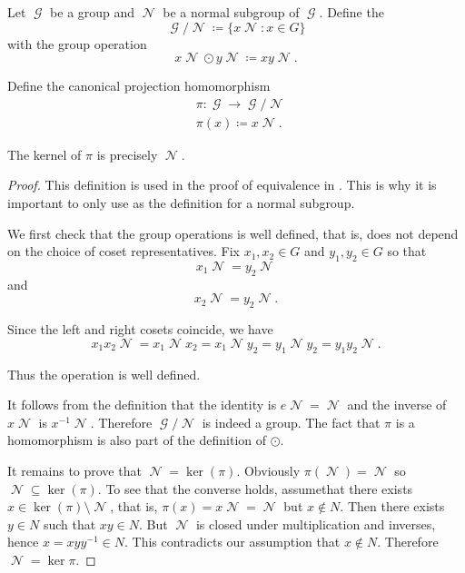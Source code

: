\begin{definition}\label{def:quotient_group}
  Let \( \mscrG \) be a group and \( \mscrN \) be a normal subgroup of \( \mscrG \). Define the 
  \begin{equation*}
    \mscrG / \mscrN \coloneqq \{ x \mscrN \colon x \in G \}
  \end{equation*}
  with the group operation
  \begin{equation*}
    x \mscrN \odot y \mscrN \coloneqq xy \mscrN.
  \end{equation*}

  Define the canonical projection homomorphism
  \begin{align*}
    &\pi: \mscrG \to \mscrG / \mscrN \\
    &\pi(x) \coloneqq x \mscrN.
  \end{align*}

  The kernel of \( \pi \) is precisely \( \mscrN \).
\end{definition}
\begin{proof}
  This definition is used in the proof of equivalence in . This is why it is important to only use  as the definition for a normal subgroup.

  We first check that the group operations is well defined, that is, does not depend on the choice of coset representatives. Fix \( x_1, x_2 \in G \) and \( y_1, y_2 \in G \) so that
  \begin{equation*}
    x_1 \mscrN = y_2 \mscrN
  \end{equation*}
  and
  \begin{equation*}
    x_2 \mscrN = y_2 \mscrN.
  \end{equation*}

  Since the left and right cosets coincide, we have
  \begin{equation*}
    x_1 x_2 \mscrN = x_1 \mscrN x_2 = x_1 \mscrN y_2 = y_1 \mscrN y_2 = y_1 y_2 \mscrN.
  \end{equation*}

  Thus the operation is well defined.

  It follows from the definition that the identity is \( e \mscrN = \mscrN \) and the inverse of \( x \mscrN \) is \( x^{-1} \mscrN \). Therefore \( \mscrG / \mscrN \) is indeed a group. The fact that \( \pi \) is a homomorphism is also part of the definition of \( \odot \).

  It remains to prove that \( \mscrN = \ker(\pi) \). Obviously \( \pi(\mscrN) = \mscrN \) so \( \mscrN \subseteq \ker(\pi) \). To see that the converse holds, assume\DNE that there exists \( x \in \ker(\pi) \setminus \mscrN \), that is, \( \pi(x) = x\mscrN = \mscrN \) but \( x \not\in N \). Then there exists \( y \in N \) such that \( xy \in N \). But \( \mscrN \) is closed under multiplication and inverses, hence \( x = xyy^{-1} \in N \). This contradicts our assumption that \( x \not\in N \). Therefore \( \mscrN = \ker \pi \).
\end{proof}

